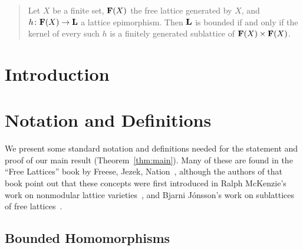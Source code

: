 \author[P.~Mayr]{Peter Mayr}

\author[N.~Ru\v{s}kuc]{Nik Ru\v{s}kuc}


\date{\today}


\begin{abstract}
Let $X$ be a finite set, $\mathbf{F} (X)$ the free lattice 
generated by $X$, and $h \colon \mathbf{F}(X) \to \mathbf{L}$ a lattice 
epimorphism.
Then $\mathbf{L}$ is bounded if and only if the 
kernel of every such $h$ is a finitely generated sublattice of 
$\mathbf{F}(X) \times \mathbf{F}(X)$. 
\end{abstract}

\maketitle
\section{Introduction}
\label{sec:introduction}


\section{Notation and Definitions}

We present some standard notation and definitions needed for 
the statement and proof of our main result (Theorem~\ref{thm:main}).
Many of these are found in the ``Free Lattices'' book by Freese, 
Jezek, Nation~\cite{MR1319815}, although the authors of that book
point out that these concepts were first introduced in Ralph 
McKenzie's work on nonmodular lattice varieties~\cite{MR0313141}, 
and Bjarni J\'onsson's work on sublattices of free lattices~\cite{MR0472614}.

\subsection{Bounded Homomorphisms}

